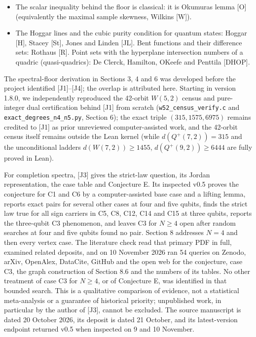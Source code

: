 \documentclass[11pt,a4paper]{article}
\begin{document}
\begin{itemize}
  {[}CGK{]}. \(\mathbb{Z}_4\)-valued quadratic forms and their character sums: {[}CCKS{]}. Two-character sets,
  two-weight codes and strongly regular graphs: Calderbank and Kantor {[}CK{]}. The bent functions of
  Maiorana and McFarland: {[}McF{]}.
\item
  The scalar inequality behind the floor is classical: it is Okumura\textquotesingle s lemma {[}O{]} (equivalently the
  maximal sample skewness, Wilkins {[}W{]}).
\item
  The Hoggar lines and the cubic purity condition for quantum states: Hoggar {[}H{]}, Stacey {[}St{]},
  Jones and Linden {[}JL{]}. Bent functions and their difference sets: Rothaus {[}R{]}. Point sets with the
  hyperplane intersection numbers of a quadric (quasi-quadrics): De Clerck, Hamilton, O\textquotesingle Keefe and
  Penttila {[}DHOP{]}.
\end{itemize}

The spectral-floor derivation in Sections 3, 4 and 6 was developed before the project identified
{[}J1{]}--{[}J4{]}; the overlap is attributed here. Starting in version 1.8.0, we independently reproduced
the 42-orbit \(W(5,2)\) census and pure-integer dual certification behind {[}J1{]} from scratch
(\nolinkurl{w52_census_verify.c} and \nolinkurl{exact_degrees_n4_n5.py}, Section 6); the exact triple
\((315, 1575, 6975)\) remains credited to {[}J1{]} as prior unreviewed computer-assisted work, and the
42-orbit census itself remains outside the Lean kernel (while \(d(Q^+(7,2)) = 315\) and the unconditional
ladders \(d(W(7,2)) \ge 1455\), \(d(Q^+(9,2)) \ge 6444\) are fully proved in Lean).

For completion spectra, {[}J3{]} gives the strict-law question, its Jordan representation, the case table
and Conjecture E. Its inspected v0.5 proves the conjecture for C1 and C6 by a computer-assisted base
case and a lifting lemma, reports exact pairs for several other cases at four and five qubits, finds
the strict law true for all sign carriers in C5, C8, C12, C14 and C15 at three qubits, reports the
three-qubit C3 phenomenon, and leaves C3 for \(N\ge4\) open after random searches at four and five
qubits found no pair. Section 8 addresses \(N=4\) and then every vertex case. The literature check
read that primary PDF in full, examined related deposits, and on 10 November 2026 ran 54 queries on
Zenodo, arXiv, OpenAlex, DataCite, GitHub and the open web for the conjecture, case C3, the graph
construction of Section 8.6 and the numbers of its tables. No other treatment of case C3 for \(N\ge4\),
or of Conjecture E, was identified in that bounded search. This is a qualitative comparison of evidence,
not a statistical meta-analysis or a guarantee of historical priority; unpublished work, in
particular by the author of {[}J3{]}, cannot be excluded. The source manuscript is dated 20 October 2026,
its deposit is dated 21 October, and its latest-version endpoint returned v0.5 when inspected on 9
and 10 November.
\end{document}
